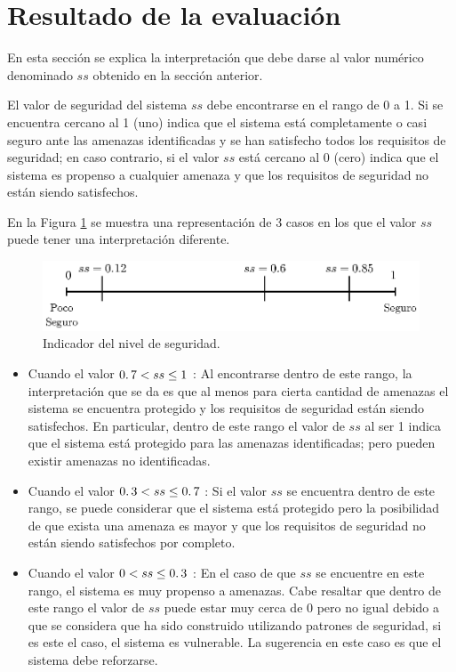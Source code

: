 \section{Resultado de la evaluación}\label{cap4_sec_Res}

En esta sección se explica la interpretación que debe darse al valor numérico denominado $ss$ obtenido en la sección anterior. 

\vspace{0.3cm}

El valor de seguridad del sistema $ss$ debe encontrarse en el rango de 0 a 1. Si se encuentra cercano al 1 (uno) indica que el sistema está completamente o casi seguro ante las amenazas identificadas y se han satisfecho todos los requisitos de seguridad; en caso contrario, si el valor $ss$ está cercano al 0 (cero) indica que el sistema es propenso a cualquier amenaza y que los requisitos de seguridad no están siendo satisfechos. 

En la Figura \ref{resulss} se muestra una representación de 3 casos en los que el valor $ss$ puede tener una interpretación diferente. 

\begin{figure}[!ht]
  \centering
    \includegraphics[scale=1]{Imagenes/fig_resultSS.eps}
    \caption{Indicador del nivel de seguridad.}
    \label{resulss}
\end{figure}

\begin{itemize}[noitemsep]
\item Cuando el valor $0\ldotp7 < ss \leq 1$ : Al encontrarse dentro de este rango, la interpretación que se da es que al menos para cierta cantidad de amenazas el sistema se encuentra protegido y los requisitos de seguridad están siendo satisfechos. En particular, dentro de este rango el valor de $ss$ al ser 1 indica que el sistema está protegido para las amenazas identificadas; pero pueden existir amenazas no identificadas.
\item Cuando el valor $0\ldotp3 < ss \leq  0\ldotp7$ : Si el valor $ss$ se encuentra dentro de este rango, se puede considerar que el sistema está protegido pero la posibilidad de que exista una amenaza es mayor y que los requisitos de seguridad no están siendo satisfechos por completo.
\item Cuando el valor $0 < ss \leq 0\ldotp3$ : En el caso de que $ss$ se encuentre en este rango, el sistema es muy propenso a amenazas. Cabe resaltar que dentro de este rango el valor de $ss$ puede estar muy cerca de 0 pero no igual debido a que se considera que ha sido construido utilizando patrones de seguridad, si es este el caso, el sistema es vulnerable. La sugerencia en este caso es que el sistema debe reforzarse.
\end{itemize}

